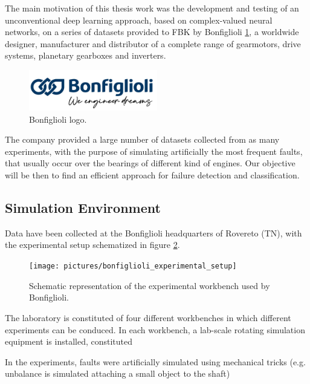 \documentclass[../main.tex]{subfiles}
\begin{document}
The main motivation of this thesis work was the development and testing of an unconventional deep learning approach, based on complex-valued neural networks, on a series of datasets provided to FBK by Bonfiglioli \ref{fig:bonfiglioli_logo}, a worldwide designer, manufacturer and distributor of a complete range of gearmotors, drive systems, planetary gearboxes and inverters.\\
\begin{figure}
	\includegraphics[width=0.5\textwidth]{pictures/bonfiglioli_logo.pdf}
	\caption{Bonfiglioli logo.}
	\label{fig:bonfiglioli_logo}
\end{figure}
The company provided a large number of datasets collected from as many experiments, with the purpose of simulating artificially the most frequent faults, that usually occur over the bearings of different kind of engines. Our objective will be then to find an efficient approach for failure detection and classification.

\subsection{Simulation Environment}

Data have been collected at the Bonfiglioli headquarters of Rovereto (TN), with the experimental setup schematized in figure \ref{fig:bonfiglioli_experimental_setup}.
\begin{figure}[!ht]
	\centering
	\texttt{[image: pictures/bonfiglioli\_experimental\_setup]}
	\caption{Schematic representation of the experimental workbench used by Bonfiglioli.}
	\label{fig:bonfiglioli_experimental_setup}	
\end{figure}
The laboratory is constituted of four different workbenches in which different experiments can be conduced. In each workbench, a lab-scale rotating simulation equipment is installed, constituted 

In the experiments, faults were artificially simulated using mechanical tricks (e.g. unbalance is simulated attaching a small object to the shaft)



\end{document}
